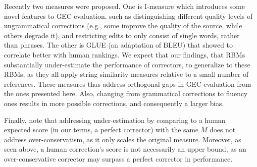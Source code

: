 \documentclass[letter,11pt]{article}
\begin{document}
Recently two measures were proposed.
One is {\sc I-measure} \cite{felice2015towards}
which introduces some novel features to GEC evaluation, such as distinguishing
different quality levels of ungrammatical corrections (e.g., some improve the quality of
the source, while others degrade it), and restricting edits to only consist of single words,
rather than phrases. The other is GLUE \cite{napoles2015ground} (an adaptation of BLEU) that showed to correlate better with human rankings. We expect that our findings, that RBMs substantially under-estimate the
performance of correctors, to generalize to these RBMs, as they all
apply string similarity measures relative to a small number of references.
These measures thus address orthogonal gaps in GEC evaluation from the ones presented here. Also, changing from grammatical corrections to fluency ones \cite{sakaguchi2016reassessing} results in more possible corrections, and consequently a larger bias.

Finally, note that addressing under-estimation by comparing to
a human expected score (in our terms, a perfect corrector) with the same $M$ \cite{bryant2015far} does not address over-conservatism, as it only
scales the original measure. Moreover, as seen above, a human correction's score
is not necessarily an upper bound, as an over-conservative corrector may surpass a perfect corrector in performance.
\end{document}
